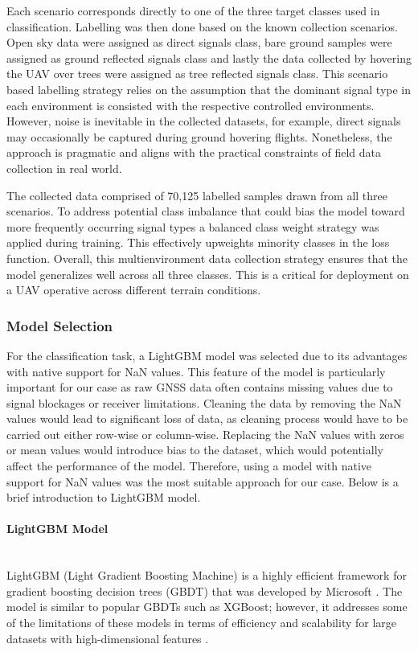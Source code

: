 \documentclass[12pt, a4paper]{article}
\begin{document}
Each scenario corresponds directly to one of the three target classes used in classification.
Labelling was then done based on the known collection scenarios. Open sky data were assigned as 
direct signals class, bare ground samples were assigned as ground reflected signals class and lastly the 
data collected by hovering the UAV over trees were assigned as tree reflected signals class. This scenario based
labelling strategy relies on the assumption that the dominant signal type in 
each environment is consisted with the respective controlled environments. However, noise is inevitable in the collected datasets,
for example, direct signals may occasionally be captured during ground hovering flights. Nonetheless, the approach is pragmatic and aligns with 
the practical constraints of field data collection in real world. 

The collected data comprised of 70,125 labelled samples drawn from all three scenarios. To address potential class 
imbalance that could bias the model toward more frequently occurring signal types a balanced class weight strategy was applied during training. This effectively
upweights minority classes in the loss function. Overall, this multienvironment data collection strategy ensures 
that the model generalizes well across all three classes. This is a critical for deployment on a UAV operative across different terrain conditions.


\subsubsection{Model Selection}
For the classification task, a LightGBM model was selected due to its advantages
with native support for NaN values. This feature of the model is particularly
important for our case as raw GNSS data often contains missing values due to
signal blockages or receiver limitations. Cleaning the data by removing the NaN
values would lead to significant loss of data, as cleaning process would have to
be carried out either row-wise or column-wise. Replacing the NaN values with
zeros or mean values would introduce bias to the dataset, which would
potentially affect the performance of the model. Therefore, using a model with
native support for NaN values was the most suitable approach for our case. Below
is a brief introduction to LightGBM model. \paragraph{LightGBM Model} ~\\
LightGBM (Light Gradient Boosting Machine) is a highly efficient framework 
for gradient boosting decision trees (GBDT) that was developed by Microsoft
\cite{ke2017lightgbm}. The model is similar to popular GBDTs such as XGBoost;
however, it addresses some of the limitations of these models in terms of efficiency 
and scalability for large datasets with high-dimensional features \cite{ke2017lightgbm}.
\end{document}
